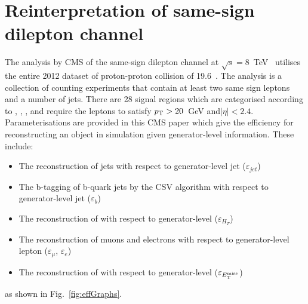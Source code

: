 \section{Reinterpretation of same-sign dilepton channel \label{sec:reinterp}}

The analysis by CMS of the same-sign dilepton channel at $\sqrt{s}=8$~TeV~\cite{Chatrchyan:2013fea} utilises the entire 2012 dataset of proton-proton collision of 19.6~\fbinv. The analysis is a collection of counting experiments that contain at least two same sign leptons and a number of jets. There are 28 signal regions which are categorised according to \njets, \nbtags, \HT, \MET and require the leptons to satisfy $p_{\mathrm{T}}>20$~GeV and$|\eta|<2.4$.
Parameterisations are provided in this CMS paper which give the efficiency for reconstructing an object in simulation given generator-level information. These include:
\begin{itemize}
\item The reconstruction of jets with respect to generator-level jet \pt ($\varepsilon_{jet}$)
\item The b-tagging of b-quark jets by the CSV algorithm with respect to generator-level jet \pt ($\varepsilon_{b}$)
\item The reconstruction of \HT with respect to generator-level \HT ($\varepsilon_{H_T}$)
\item The reconstruction of muons and electrons with respect to generator-level lepton \pt ($\varepsilon_{\mu}$, $\varepsilon_{e}$)
\item The reconstruction of \MET with respect to generator-level \MET ($\varepsilon_{E_{\mathrm{T}}^{\text{miss}}}$) 
\end{itemize}
as shown in Fig.~\ref{fig:effGraphs}.

